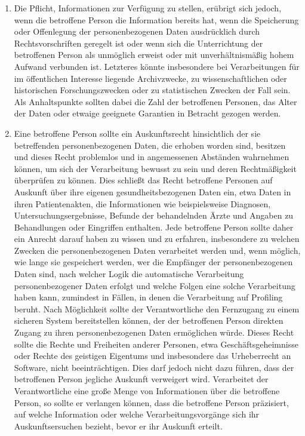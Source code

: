 \begin{enumerate}

   \item Die Pflicht, Informationen zur Verfügung zu stellen, erübrigt sich jedoch, wenn die betroffene Person die
    Information bereits hat, wenn die Speicherung oder Offenlegung der personenbezogenen Daten ausdrücklich durch
    Rechtsvorschriften geregelt ist oder wenn sich die Unterrichtung der betroffenen Person als unmöglich erweist oder
    mit unverhältnismäßig hohem Aufwand verbunden ist. Letzteres könnte insbesondere bei Verarbeitungen für im
    öffentlichen Interesse liegende Archivzwecke, zu wissenschaftlichen oder historischen Forschungszwecken oder zu
    statistischen Zwecken der Fall sein. Als Anhaltspunkte sollten dabei die Zahl der betroffenen Personen, das Alter
    der Daten oder etwaige geeignete Garantien in Betracht gezogen werden.%
   \label{eg:62}
   

   \item Eine betroffene Person sollte ein Auskunftsrecht hinsichtlich der sie betreffenden personenbezogenen Daten, die
    erhoben worden sind, besitzen und dieses Recht problemlos und in angemessenen Abständen wahrnehmen können, um sich
    der Verarbeitung bewusst zu sein und deren Rechtmäßigkeit überprüfen zu können. Dies schließt das Recht betroffene
    Personen auf Auskunft über ihre eigenen gesundheitsbezogenen Daten ein, etwa Daten in ihren Patientenakten, die
    Informationen wie beispielsweise Diagnosen, Untersuchungsergebnisse, Befunde der behandelnden Ärzte und Angaben zu
    Behandlungen oder Eingriffen enthalten. Jede betroffene Person sollte daher ein Anrecht darauf haben zu wissen und
    zu erfahren, insbesondere zu welchen Zwecken die personenbezogenen Daten verarbeitet werden und, wenn möglich, wie
    lange sie gespeichert werden, wer die Empfänger der personenbezogenen Daten sind, nach welcher Logik die
    automatische Verarbeitung personenbezogener Daten erfolgt und welche Folgen eine solche Verarbeitung haben kann,
    zumindest in Fällen, in denen die Verarbeitung auf Profiling beruht. Nach Möglichkeit sollte der Verantwortliche
    den Fernzugang zu einem sicheren System bereitstellen können, der der betroffenen Person direkten Zugang zu ihren
    personenbezogenen Daten ermöglichen würde. Dieses Recht sollte die Rechte und Freiheiten anderer Personen, etwa
    Geschäftsgeheimnisse oder Rechte des geistigen Eigentums und insbesondere das Urheberrecht an Software, nicht
    beeinträchtigen. Dies darf jedoch nicht dazu führen, dass der betroffenen Person jegliche Auskunft verweigert wird.
    Verarbeitet der Verantwortliche eine große Menge von Informationen über die betroffene Person, so sollte er
    verlangen können, dass die betroffene Person präzisiert, auf welche Information oder welche Verarbeitungsvorgänge
    sich ihr Auskunftsersuchen bezieht, bevor er ihr Auskunft erteilt.%
   \label{eg:63}
   

\end{enumerate}

